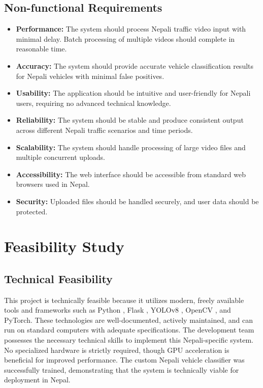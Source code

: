 \documentclass[12pt,a4paper]{report}
\begin{document}
\subsection{Non-functional Requirements}
\begin{itemize}
    \item \textbf{Performance:} The system should process Nepali traffic video input with minimal delay. Batch processing of multiple videos should complete in reasonable time.
    \item \textbf{Accuracy:} The system should provide accurate vehicle classification results for Nepali vehicles with minimal false positives.
    \item \textbf{Usability:} The application should be intuitive and user-friendly for Nepali users, requiring no advanced technical knowledge.
    \item \textbf{Reliability:} The system should be stable and produce consistent output across different Nepali traffic scenarios and time periods.
    \item \textbf{Scalability:} The system should handle processing of large video files and multiple concurrent uploads.
    \item \textbf{Accessibility:} The web interface should be accessible from standard web browsers used in Nepal.
    \item \textbf{Security:} Uploaded files should be handled securely, and user data should be protected.
\end{itemize}

\section{Feasibility Study}

\subsection{Technical Feasibility}
This project is technically feasible because it utilizes modern, freely available tools and frameworks such as Python \cite{pytorch2019automatic}, Flask \cite{flask2023}, YOLOv8 \cite{ultralytics2023yolov8}, OpenCV \cite{opencv2000the}, and PyTorch. These technologies are well-documented, actively maintained, and can run on standard computers with adequate specifications. The development team possesses the necessary technical skills to implement this Nepali-specific system. No specialized hardware is strictly required, though GPU acceleration is beneficial for improved performance. The custom Nepali vehicle classifier was successfully trained, demonstrating that the system is technically viable for deployment in Nepal.
\end{document}
